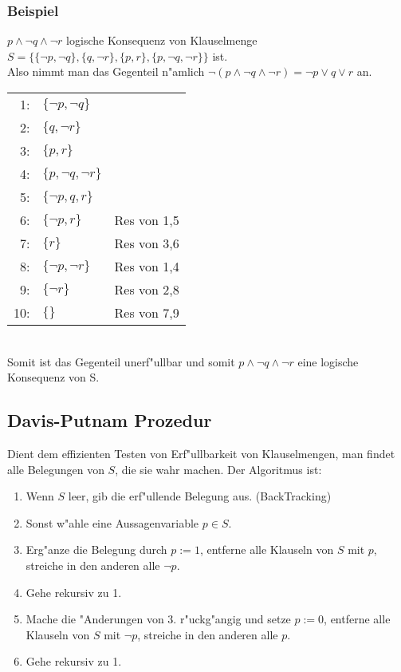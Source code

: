 \documentclass[11pt, a4paper,twocolumn]{scrartcl}
\begin{document}
\subsubsection{Beispiel}

$p\land\lnot q\land\lnot r$ logische Konsequenz von Klauselmenge $S=\{\{\lnot p,\lnot q\},\{q,\lnot r\},\{p,r\},\{p,\lnot q,\lnot r\}\}$ ist.\\
Also nimmt man das Gegenteil n"amlich $\lnot(p\land\lnot q\land\lnot r)=\lnot p\lor q\lor r$ an.\\

\begin{tabular}{rll}
 1:&	$\{\lnot p, \lnot q\}$ \\
 2:&	$\{q,\lnot r\}$\\
 3:&	$\{p,r\}$\\
 4:&	$\{p,\lnot q,\lnot r\}$\\
 5:&	$\{\lnot p, q, r\}$\\
 6:&	$\{\lnot p, r\}$&		Res von 1,5\\
 7:&	$\{r\}$ &			Res von 3,6\\
 8:&	$\{\lnot p,\lnot r\}$ &		Res von 1,4\\
 9:&	$\{\lnot r\}$ &			Res von 2,8\\
 10:&	$\{\}$ &			Res von 7,9\\
\end{tabular}\\

Somit ist das Gegenteil unerf"ullbar und somit $p\land\lnot q\land\lnot r$ eine logische Konsequenz von S.
\subsection{Davis-Putnam Prozedur}
Dient dem effizienten Testen von Erf"ullbarkeit von Klauselmengen, man findet alle Belegungen von $S$, die sie wahr machen. Der Algoritmus ist:
\begin{enumerate}
 \item Wenn $S$ leer, gib die erf"ullende Belegung aus. (BackTracking)
 \item Sonst w"ahle eine Aussagenvariable $p \in S$.
 \item Erg"anze die Belegung durch $p := 1$, entferne alle Klauseln von $S$ mit $p$, streiche in den anderen alle $\lnot p$.
 \item Gehe rekursiv zu 1.
 \item Mache die "Anderungen von 3. r"uckg"angig und setze $p := 0$, entferne alle Klauseln von $S$ mit $\lnot p$, streiche in den anderen alle $p$.
 \item Gehe rekursiv zu 1.
 \end{enumerate}
\end{document}
